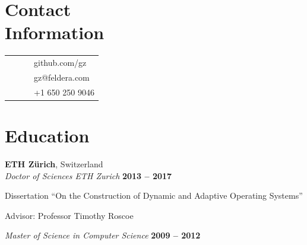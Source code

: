 \documentclass[margin,line]{cv/cv}
\begin{document}
\begin{resume}

    \section{\mysidestyle Contact\\Information}

    \begin{tabularx}{\textwidth}{lXcl}
        &                   & \raisebox{-3pt}{\faGithub} & github.com/gz     \\
        &                   & \raisebox{-3pt}{\Envelope} & gz@feldera.com    \\
        &                   & \raisebox{-3pt}{\Phone}    & +1  650 250 9046  \\
    \end{tabularx}

    \section{\mysidestyle  Education}

    \textbf{ETH Zürich}, Switzerland \vspace{2mm}\\\vspace{1mm}%
    \textsl{Doctor of Sciences ETH Zurich} \hfill \textbf{2013 -- 2017}\vspace{-3mm}\\\vspace{-1mm}%
    \begin{list2}
        \item Dissertation ``On the Construction of Dynamic and Adaptive Operating Systems''
        \item Advisor: Professor Timothy Roscoe
    \end{list2}\vspace{-1.5mm}

    \textsl{Master of Science in Computer Science} \hfill \textbf{2009 -- 2012}\vspace{-3mm}\\\vspace{-1mm}%


\end{resume}
\end{document}
